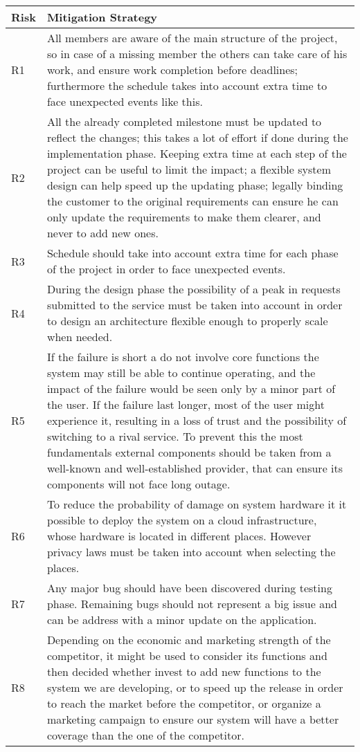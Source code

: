 \bigskip

\noindent
\begin{tabular}{| l | p{13cm}  |}
\hline
\textbf{Risk} & \textbf{Mitigation Strategy}\\
\hline
R1 & All members are aware of the main structure of the project, so in case of a missing member the others can take care of his work, and ensure work completion before deadlines; furthermore the schedule takes into account extra time to face unexpected events like this.\\
\hline
R2 & All the already completed milestone must be updated to reflect the changes; this takes a lot of effort if done during the implementation phase. Keeping extra time at each step of the project can be useful to limit the impact; a flexible system design can help speed up the updating phase; legally binding the customer to the original requirements can ensure he can only update the requirements to make them clearer, and never to add new ones.\\
\hline
R3 & Schedule should take into account extra time for each phase of the project in order to face unexpected events.\\
\hline
R4 & During the design phase the possibility of a peak in requests submitted to the service must be taken into account in order to design an architecture flexible enough to properly scale when needed.\\
\hline
R5 & If the failure is short a do not involve core functions the system may still be able to continue operating, and the impact of the failure would be seen only by a minor part of the user. If the failure last longer, most of the user might experience it, resulting in a loss of trust and the possibility of switching to a rival service. To prevent this the most fundamentals external components should be taken from a well-known and well-established provider, that can ensure its components will not face long outage.\\
\hline
R6 & To reduce the probability of damage on system hardware it it possible to deploy the system on a cloud infrastructure, whose hardware is located in different places. However privacy laws must be taken into account when selecting the places.\\
\hline
R7 & Any major bug should have been discovered during testing phase. Remaining bugs should not represent a big issue and can be address with a minor update on the application.\\
\hline
R8 & Depending on the economic and marketing strength of the competitor, it might be used to consider its functions and then decided whether invest to add new functions to the system we are developing, or to speed up the release in order to reach the market before the competitor, or organize a marketing campaign to ensure our system will have a better coverage than the one of the competitor.\\

\end{tabular}
